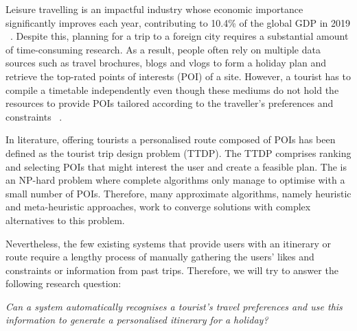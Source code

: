 
Leisure travelling is an impactful industry
whose economic importance significantly improves each
year, contributing to 10.4\% of the global GDP in 2019
~\cite{wttc2018travel}. Despite this, planning for a trip to a
foreign city requires a substantial amount of
time-consuming research. As a result, people often
rely on multiple data sources such as travel
brochures, blogs and vlogs to form a holiday plan and
retrieve the top-rated points of interests (POI) of a site. 
However, a tourist has to compile a timetable
independently even though these mediums do not hold the
resources to provide POIs tailored according to the
traveller's preferences and constraints
~\cite{DeChoudhury2010}. 

In literature, offering tourists a personalised route
composed of POIs has been defined as the tourist trip
design problem (TTDP). The TTDP comprises ranking
and selecting POIs that might interest the user and
create a feasible plan. 
The is an NP-hard problem where complete 
algorithms only manage to optimise with a small number
of POIs. Therefore, many approximate algorithms,
namely heuristic and meta-heuristic approaches, work
to converge solutions with complex alternatives to
this problem.

Nevertheless, the few existing systems that provide
users with an itinerary or route require a lengthy
process of manually gathering the users' likes and
constraints or information from past trips. Therefore, 
we will try to answer the following research question:


\begin{center}

    \textit{Can a system automatically recognises a tourist's travel
    preferences and use this information to generate a personalised itinerary
for a holiday?}

\end{center}


